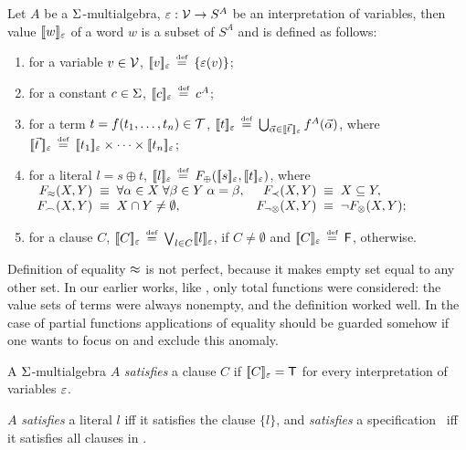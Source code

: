\begin{definition} \label {def:nd-semantics}
Let $A$ be a \(\Funcs\)-multialgebra, \(\epsi: \Vars \to S^A\) be an
interpretation of variables, then value \(\Value w\) of a word $w$ is a
subset of $S^A$
and is defined as follows:
\begin{enumerate}\smallerspaces
\item for a variable \(v\in\Vars\), \(\Value v \Def \{\epsi(v)\}\);
  \label {semantics-v}
\item for a constant $c\in\Funcs$, \(\Value c \Def c^A\);
\item for a term \(t=f(\List tn,)\in \Terms\),  \(\Value t \Def
  \bigcup_{\vec{\alpha} \in \Value{\vec t\,}} 
  f^A(\vec{\alpha})\), where \(\Value{\vec{t\,}}\Def \Value{t_1}\times \cdots
  \times \Value{t_n}\); 
  \label {semantics1}
\item for a literal \(l=s\oplus t\), \(\Value l \Def
  F_\oplus(\Value s, \Value t)\), where
  \vspace{1ex}\newline \(
  \begin{array}{r@{\ \equiv\ } l@{\quad}r@{\ \equiv\ } l}
      F_{\Eq}(X,Y) & \forall \alpha\in X\; \forall \beta\in Y\;\alpha=\beta, &
      F_{\Incl}(X,Y) & X\subseteq Y,\\
      F_{\Int}(X,Y) & X\cap Y\neq \es, &
      F_{\neg\otimes}(X,Y) & \neg F_\otimes(X,Y);
  \end{array}\)
  \label {semantics3}
\item for a clause \(C\), \(\Value C \Def
  \bigvee_{l\in C} \Value{l} \), if \(C\neq \emptyset\) and \(\Value C \Def
  \false\), otherwise.  
  \label {semantics4}
\vspace{-1ex}
\end{enumerate}
\end{definition}

Definition of equality $\Eq$ is not perfect, because it makes empty set equal
to any other set.  In our earlier works, like \cite{MW,KW}, only total
functions were considered: the value sets of terms were always nonempty,
and the definition worked well. In the case of partial functions applications
of equality should be guarded somehow if one wants to focus on and 
exclude this anomaly.

\begin{definition}\label {def:satisfies}
A \(\Funcs\)-multialgebra $A$ {\em satisfies} a clause $C$ if \(\Value C =
\true\) for every interpretation of variables \(\epsi\).

$A$ {\em satisfies} a literal $l$ iff it satisfies the clause
\(\{ l\}\), and {\em satisfies} a specification \Spec\ iff it satisfies all
clauses in \Spec.
\end{definition}

